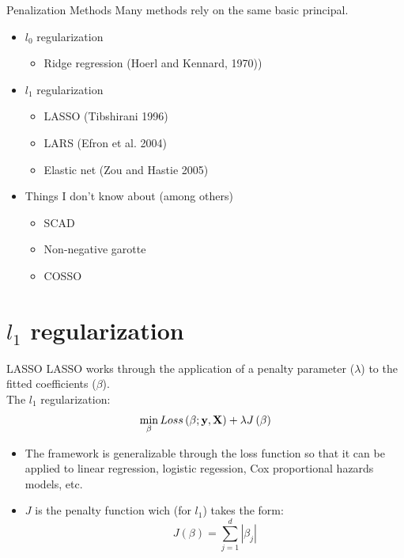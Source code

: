 \documentclass{beamer}\usepackage[]{graphicx}\usepackage[]{color}
\begin{document}
\begin{frame}{Penalization Methods}
Many methods rely on the same basic principal.
\bigskip

\begin{itemize}
\item $l_0$ regularization
  \begin{itemize}
  \item Ridge regression (Hoerl and Kennard, 1970))
  \end{itemize}
\smallskip
\pause
\item $l_1$ regularization
  \begin{itemize}
  \item LASSO (Tibshirani 1996)
  \item LARS (Efron et al. 2004)
  \item Elastic net (Zou and Hastie 2005)
  \end{itemize}
\smallskip
\pause
\item Things I don't know about (among others)
  \begin{itemize}
  \item SCAD
  \item Non-negative garotte
  \item COSSO
  \end{itemize}
\end{itemize}
\end{frame}

\section{$l_1$ regularization}

\begin{frame}{LASSO}
LASSO works through the application of a penalty parameter ($\lambda$) to the fitted coefficients ($\beta$).\\
The $l_1$ regularization:
$$\min_\beta Loss\left(\beta; \bf{y,X} \right) + \lambda J\left(\beta\right)$$
\pause
\begin{itemize}
\item The framework is generalizable through the loss function so that it can be applied to linear regression, logistic regession, Cox proportional hazards models, etc.
\pause
\item $J$ is the penalty function wich (for $l_1$) takes the form: $$J\left(\beta \right) = \sum_{j=1}^d |\beta_j|$$
\end{itemize}
\end{frame}
\end{document}
